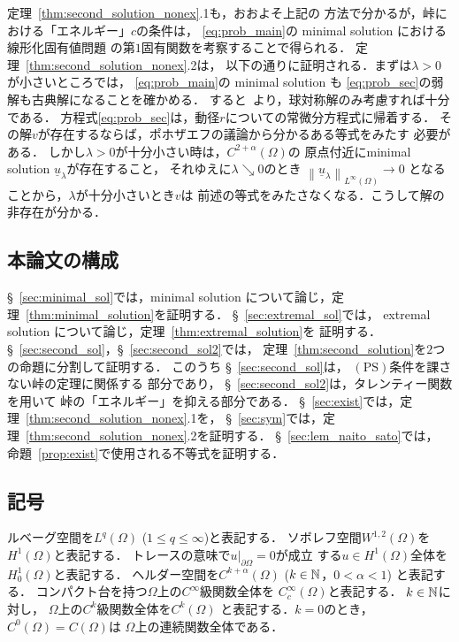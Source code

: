 定理~\ref{thm:second_solution_nonex}.1も，おおよそ上記の
方法で分かるが，峠における「エネルギー」$c$の条件は，
\ref{eq:prob_main}の minimal solution における線形化固有値問題
の第$1$固有関数を考察することで得られる．
定理~\ref{thm:second_solution_nonex}.2は，
以下の通りに証明される．まずは$\lambda > 0$が小さいところでは，
\ref{eq:prob_main}の minimal solution も
\ref{eq:prob_sec}の弱解も古典解になることを確かめる．
すると\cite{MR544879}~より，球対称解のみ考慮すれば十分である．
方程式\ref{eq:prob_sec}は，動径$r$についての常微分方程式に帰着する．
その解$v$が存在するならば，ポホザエフの議論から分かるある等式をみたす
必要がある．
しかし$\lambda > 0$が十分小さい時は，$C^{2 + \alpha}(\Omega)$の
原点付近にminimal solution $\underline{u}_\lambda$が存在すること，
それゆえに$\lambda \searrow 0$のとき
$\left\| \underline{u}_\lambda \right\|_{L^\infty(\Omega)} \to 0$
となることから，$\lambda$が十分小さいとき$v$は
前述の等式をみたさなくなる．こうして解の非存在が分かる．

\subsection{本論文の構成}

\S~\ref{sec:minimal_sol}では，minimal solution について論じ，定
理~\ref{thm:minimal_solution}を証明する．
\S~\ref{sec:extremal_sol}では，
extremal solution について論じ，定理~\ref{thm:extremal_solution}を
証明する．
\S~\ref{sec:second_sol}，\S~\ref{sec:second_sol2}では，
定理~\ref{thm:second_solution}を$2$つの命題に分割して証明する．
このうち
\S~\ref{sec:second_sol}は，
$(\mathrm{PS})$条件を課さない峠の定理に関係する
部分であり，
\S~\ref{sec:second_sol2}は，タレンティー関数を用いて
峠の「エネルギー」を抑える部分である．
\S~\ref{sec:exist}では，定理~\ref{thm:second_solution_nonex}.1を，
\S~\ref{sec:sym}では，定理~\ref{thm:second_solution_nonex}.2を証明する．
\S~\ref{sec:lem_naito_sato}では，
命題~\ref{prop:exist}で使用される不等式を証明する．

\subsection{記号}

ルベーグ空間を$L^q(\Omega)$ ($1 \leq q \leq \infty$)と表記する．
ソボレフ空間$W^{1, 2}(\Omega)$を$H^1(\Omega)$と表記する．
トレースの意味で$u |_{\partial \Omega} = 0$が成立
する$u \in H^1(\Omega)$全体を$H_0^1(\Omega)$と表記する．
ヘルダー空間を$C^{k + \alpha}(\Omega)$ ($k \in \mathbb{N}$，$0 < \alpha < 1$)
と表記する．
コンパクト台を持つ$\Omega$上の$C^\infty$級関数全体を
$C^\infty_c (\Omega)$と表記する．
$k \in \mathbb{N}$に対し，
$\Omega$上の$C^k$級関数全体を$C^k(\Omega)$
と表記する．$k = 0$のとき，$C^0(\Omega) = C(\Omega)$は
$\Omega$上の連続関数全体である．

